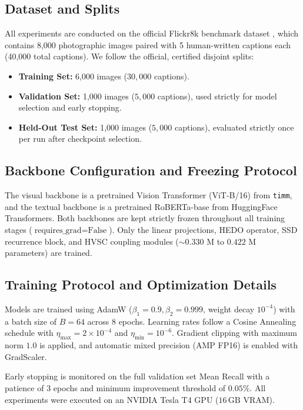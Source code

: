 \documentclass[11pt,journal,onecolumn,draftcls]{IEEEtran}
\begin{document}
\subsection{Dataset and Splits}
All experiments are conducted on the official Flickr8k benchmark dataset \cite{young2014image}, which contains 8,000 photographic images paired with 5 human-written captions each (40,000 total captions). We follow the official, certified disjoint splits:
\begin{itemize}
    \item \textbf{Training Set:} 6,000 images ($30{,}000$ captions).
    \item \textbf{Validation Set:} 1,000 images ($5{,}000$ captions), used strictly for model selection and early stopping.
    \item \textbf{Held-Out Test Set:} 1,000 images ($5{,}000$ captions), evaluated strictly once per run after checkpoint selection.
\end{itemize}

\subsection{Backbone Configuration and Freezing Protocol}
The visual backbone is a pretrained Vision Transformer (ViT-B/16) from \texttt{timm}, and the textual backbone is a pretrained RoBERTa-base from HuggingFace Transformers. Both backbones are kept strictly frozen throughout all training stages ($\text{requires\_grad} = \text{False}$). Only the linear projections, HEDO operator, SSD recurrence block, and HVSC coupling modules ($\sim 0.330\text{ M}$ to $0.422\text{ M}$ parameters) are trained.

\subsection{Training Protocol and Optimization Details}
Models are trained using AdamW ($\beta_1 = 0.9, \beta_2 = 0.999$, weight decay $10^{-4}$) with a batch size of $B=64$ across 8 epochs. Learning rates follow a Cosine Annealing schedule with $\eta_{\text{max}} = 2 \times 10^{-4}$ and $\eta_{\text{min}} = 10^{-6}$. Gradient clipping with maximum norm $1.0$ is applied, and automatic mixed precision (AMP FP16) is enabled with GradScaler.

Early stopping is monitored on the full validation set Mean Recall with a patience of 3 epochs and minimum improvement threshold of $0.05\%$. All experiments were executed on an NVIDIA Tesla T4 GPU ($16\,\text{GB}$ VRAM).
\end{document}

